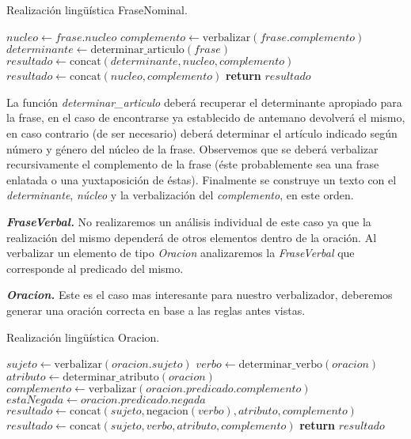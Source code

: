 \begin{algorithm}[H]
\caption{Realización lingüística FraseNominal.}
\begin{algorithmic}[1]
\State $nucleo\gets frase.nucleo$
\State $complemento\gets \text{verbalizar}(frase.complemento)$
\State $determinante\gets \text{determinar\_articulo}(frase)$
\State $resultado\gets \text{concat}(determinante, nucleo, complemento)$
\Else
\State $resultado\gets \text{concat}(nucleo, complemento)$
\EndIf
\Statex
\State \textbf{return} $resultado$
\EndFunction
\end{algorithmic}
\end{algorithm}

\noindent
La función \emph{determinar\_articulo} deberá recuperar el determinante apropiado para la frase, en el caso de encontrarse ya establecido de antemano devolverá el mismo, en caso contrario (de ser necesario) deberá determinar el artículo indicado según número y género del núcleo de la frase. Observemos que se deberá verbalizar recursivamente el complemento de la frase (éste probablemente sea una frase enlatada o una yuxtaposición de éstas). Finalmente se construye un texto con el \emph{determinante}, \emph{núcleo} y la verbalización del \emph{complemento}, en este orden.

\medskip
\noindent
\textbf{\emph{FraseVerbal.}} No realizaremos un análisis individual de este caso ya que la realización del mismo dependerá de otros elementos dentro de la oración. Al verbalizar un elemento de tipo \emph{Oracion} analizaremos la \emph{FraseVerbal} que corresponde al predicado del mismo.


\medskip
\noindent
\textbf{\emph{Oracion.}} Este es el caso mas interesante para nuestro verbalizador, deberemos generar una oración correcta en base a las reglas antes vistas. 

\begin{algorithm}[H]
\caption{Realización lingüística Oracion.}
\begin{algorithmic}[1]
\State $sujeto\gets \text{verbalizar}(oracion.sujeto)$
\State $verbo\gets \text{determinar\_verbo}(oracion)$
\State $atributo\gets \text{determinar\_atributo}(oracion)$
\State $complemento\gets \text{verbalizar}(oracion.predicado.complemento)$
\State $estaNegada\gets oracion.predicado.negada$
\Statex
{}
\State $resultado\gets \text{concat}(sujeto, \text{negacion}(verbo), atributo, complemento)$
\Else
\State $resultado\gets \text{concat}(sujeto, verbo, atributo, complemento)$
\EndIf
\Statex
\State \textbf{return} $resultado$
\EndFunction
\end{algorithmic}
\end{algorithm}

